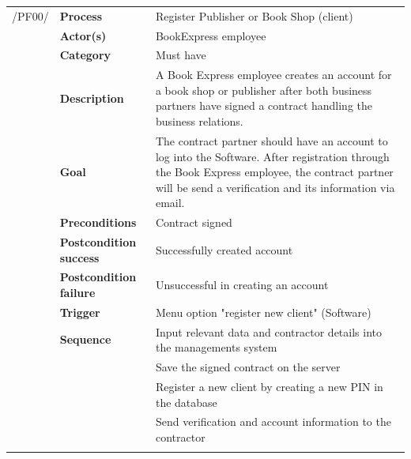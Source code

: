 \documentclass[11pt,a4paper,oneside,svgnames]{report}
\begin{document}
\noindent
{}
\begin{tabular}{p{1.5cm}p{3cm}p{8cm}}
\cellcolor{white}/PF00/	& \textbf{Process}	& Register Publisher or Book Shop (client)\\
\cellcolor{white}		& \textbf{Actor(s)} & BookExpress employee\\
\cellcolor{white}		& \textbf{Category} & Must have\\
\cellcolor{white}		& \textbf{Description}	 & A Book Express employee creates an account for a book shop or publisher after both business partners have signed a contract handling the business relations.\\
\cellcolor{white}		& \textbf{Goal} & The contract partner should have an account to log into the Software. After registration through the Book Express employee, the contract partner will be send a verification and its information via email.\\
\cellcolor{white}		& \textbf{Preconditions} & Contract signed\\
\cellcolor{white}		& \textbf{Postcondition success} & Successfully created account\\
\cellcolor{white}		& \textbf{Postcondition failure} & Unsuccessful in creating an account\\
\cellcolor{white}		& \textbf{Trigger} & Menu option "register new client" (Software)\\
\cellcolor{white}		& \textbf{Sequence} & Input relevant data and contractor details into the managements system\\
\cellcolor{white}		& & Save the signed contract on the server\\
\cellcolor{white}		& & Register a new client by creating a new PIN in the database\\
\cellcolor{white}		& & Send verification and account information to the contractor\\
\cellcolor{white}\hfill \\		
\end{tabular}
\end{document}
